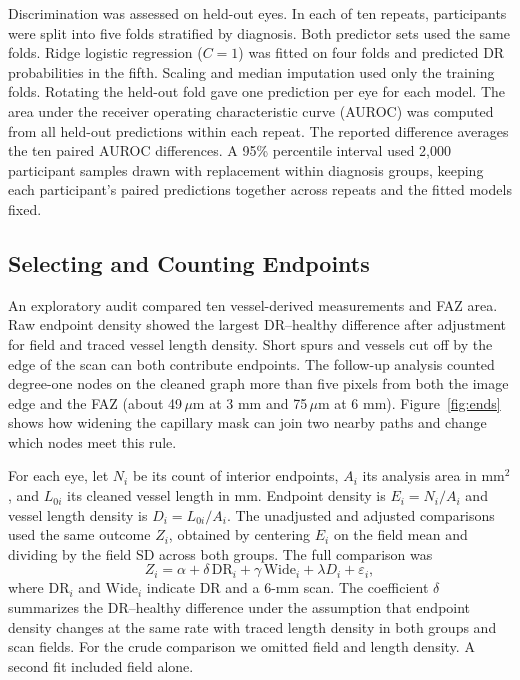 \documentclass[letterpaper]{article}
\begin{document}
Discrimination was assessed on held-out eyes. In each of ten repeats, participants were split into five folds stratified by diagnosis. Both predictor sets used the same folds. Ridge logistic regression ($C=1$) was fitted on four folds and predicted DR probabilities in the fifth. Scaling and median imputation used only the training folds. Rotating the held-out fold gave one prediction per eye for each model. The area under the receiver operating characteristic curve (AUROC) was computed from all held-out predictions within each repeat. The reported difference averages the ten paired AUROC differences. A 95\% percentile interval used 2,000 participant samples drawn with replacement within diagnosis groups, keeping each participant's paired predictions together across repeats and the fitted models fixed.

\subsection{Selecting and Counting Endpoints}
An exploratory audit compared ten vessel-derived measurements and FAZ area. Raw endpoint density showed the largest DR--healthy difference after adjustment for field and traced vessel length density. Short spurs and vessels cut off by the edge of the scan can both contribute endpoints. The follow-up analysis counted degree-one nodes on the cleaned graph more than five pixels from both the image edge and the FAZ (about 49\,$\mu$m at 3 mm and 75\,$\mu$m at 6 mm). Figure~\ref{fig:ends} shows how widening the capillary mask can join two nearby paths and change which nodes meet this rule.

For each eye, let $N_i$ be its count of interior endpoints, $A_i$ its analysis area in mm$^2$, and $L_{0i}$ its cleaned vessel length in mm. Endpoint density is $E_i=N_i/A_i$ and vessel length density is $D_i=L_{0i}/A_i$. The unadjusted and adjusted comparisons used the same outcome $Z_i$, obtained by centering $E_i$ on the field mean and dividing by the field SD across both groups. The full comparison was
\begin{equation}
 Z_i=\alpha+\delta\,\mathrm{DR}_i+\gamma\,\mathrm{Wide}_i
             +\lambda D_i+\varepsilon_i,
 \label{eq:end}
\end{equation}
where $\mathrm{DR}_i$ and $\mathrm{Wide}_i$ indicate DR and a 6-mm scan. The coefficient $\delta$ summarizes the DR--healthy difference under the assumption that endpoint density changes at the same rate with traced length density in both groups and scan fields. For the crude comparison we omitted field and length density. A second fit included field alone.
\end{document}
